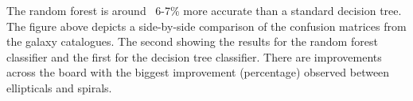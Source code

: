 The random forest is around ~6-7\% more accurate than a standard decision tree. The figure above depicts a side-by-side comparison of the confusion matrices from the galaxy catalogues. The second showing the results for the random forest classifier and the first for the decision tree classifier. There are improvements across the board with the biggest improvement (percentage) observed between ellipticals and spirals.